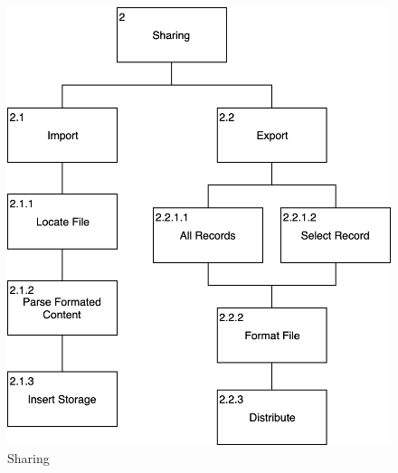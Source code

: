 \begin{figure}
    \centering
    \includegraphics[scale=0.3]{images/Sharing.png}
    \caption{Sharing}
    \label{fig:hta_sharing}
\end{figure}

